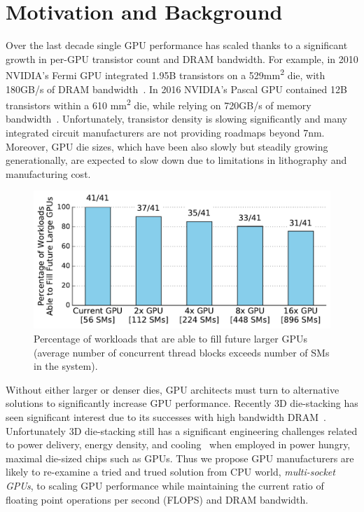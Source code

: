 \section{Motivation and Background}
\label{sec:background}

Over the last decade single GPU performance has scaled thanks to a 
significant growth in per-GPU transistor count and DRAM bandwidth. For 
example, in 2010 NVIDIA's Fermi GPU integrated 1.95B transistors on a 
529mm\textsuperscript{2} die, with 180GB/s of DRAM 
bandwidth~\cite{hennessypatterson11}. In 2016 NVIDIA's Pascal GPU 
contained 12B transistors within a 610 mm\textsuperscript{2} die, while 
relying on 720GB/s of memory bandwidth~\cite{inside-pascal}. Unfortunately, 
transistor density is slowing significantly and many integrated circuit 
manufacturers are not providing roadmaps beyond 7nm. Moreover, GPU die sizes,
which have been also slowly but steadily growing generationally, are 
expected to slow down due to limitations in lithography and manufacturing cost.

\begin{figure}[t] 
    \centering
    \includegraphics[width=1.0\columnwidth]{figures/plot_ctas_per_sm.pdf}
    \caption{Percentage of workloads that are able to fill future larger GPUs 
    (average number of concurrent thread blocks exceeds number of SMs in the system).}
    \label{fig:ctas}
    \vspace{-.2in}
\end{figure}

Without either larger or denser dies, GPU architects must turn to 
alternative solutions to significantly increase GPU performance.  Recently 3D 
die-stacking has seen significant interest due to its successes with high 
bandwidth DRAM~\cite{HBM}. Unfortunately 3D die-stacking still has 
a significant engineering challenges related to power delivery, 
energy density, and cooling~\cite{verbree2010cost} when employed in power 
hungry, maximal die-sized chips such as GPUs. Thus we propose GPU manufacturers 
are likely to re-examine a tried and trued solution from CPU world, 
\textit{multi-socket GPUs}, to scaling GPU performance while maintaining the 
current ratio of floating point operations per second (FLOPS) and DRAM 
bandwidth.

